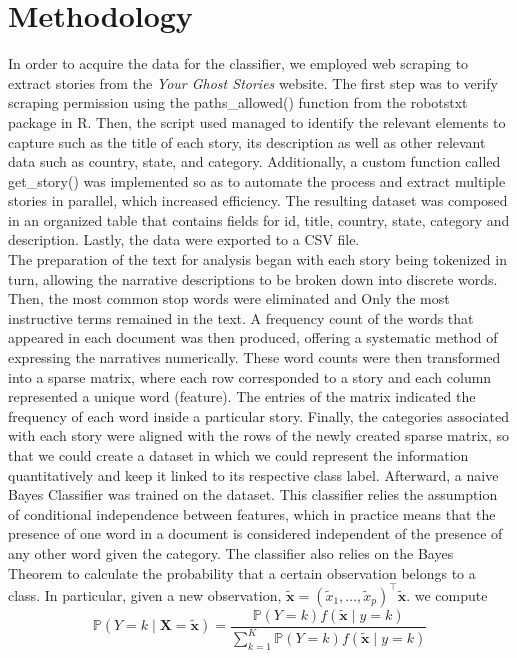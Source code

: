\documentclass[twocolumn]{article}
\begin{document}
\section{Methodology}
In order to acquire the data for the classifier, we employed web scraping to extract stories from the \textit{Your Ghost Stories} website. The first step was to verify scraping permission using the paths\_allowed() function from the robotstxt package in R. Then, the script used managed to identify the relevant elements to capture such as the title of each story, its description as well as other relevant data such as country, state, and category. Additionally, a custom function called get\_story() was implemented so as to automate the process and extract multiple stories in parallel, which increased efficiency. The resulting dataset was composed in an organized table that contains fields for id, title, country, state, category and description. Lastly, the data were exported to a CSV file. \\
The preparation of the text for analysis began with each story being tokenized in turn, allowing the narrative descriptions to be broken down into discrete words. Then, the most common stop words were eliminated and Only the most instructive terms remained in the text. A frequency count of the words that appeared in each document was then produced, offering a systematic method of  expressing the narratives numerically. These word counts were then transformed into a sparse matrix, where each row corresponded to a story and each column represented a unique word (feature). The entries of the matrix indicated the frequency of each word inside a particular story. 
Finally, the categories associated with each story were aligned with the rows of the newly created sparse matrix, so that we could create a dataset in which we could represent the information quantitatively and keep it linked to its respective class label.
Afterward, a naive Bayes Classifier was trained on the dataset. This classifier relies the assumption of conditional independence between features, which in practice means that the presence of one word in a document is considered independent of the presence of any other word given the category. The classifier also relies on the Bayes Theorem to calculate the probability that a certain observation belongs to a class.
In particular, given a new observation, 
\( \tilde{\boldsymbol{x}} = (\tilde{x}_{1}, \dots, \tilde{x}_{p})^{\intercal}\tilde{\boldsymbol{x}}.\)
we compute
\[
\mathbb{P}(Y = k \mid \boldsymbol{X} = \tilde{\boldsymbol{x}}) = \frac{\mathbb{P}(Y = k)f(\tilde{\boldsymbol{x}} \mid y = k)}{\sum_{k = 1}^{K} \mathbb{P}(Y = k)f(\tilde{\boldsymbol{x}} \mid y = k)}
\]
\end{document}
